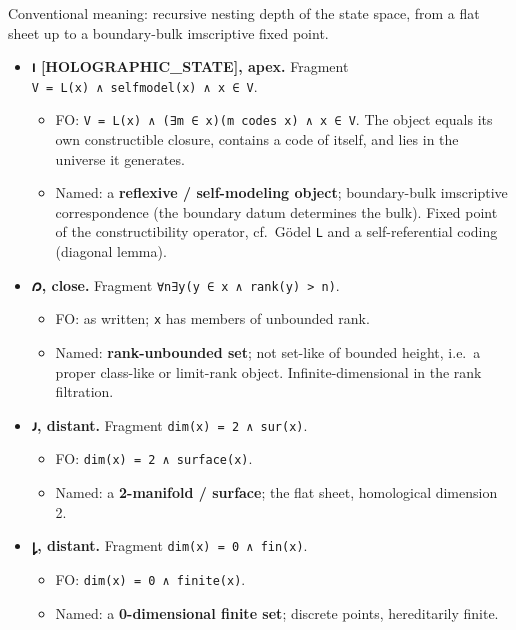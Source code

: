 \documentclass[12pt,a4paper]{article}
\begin{document}
Conventional meaning: recursive nesting depth of the state space, from a
flat sheet up to a boundary-bulk imscriptive fixed point.

\begin{itemize}
\tightlist
\item
  \textbf{𐑦 {[}HOLOGRAPHIC\_STATE{]}, apex.} Fragment
  \texttt{V\ =\ L(x)\ ∧\ selfmodel(x)\ ∧\ x\ ∈\ V}.

  \begin{itemize}
  \tightlist
  \item
    FO: \texttt{V\ =\ L(x)\ ∧\ (∃m\ ∈\ x)(m\ codes\ x)\ ∧\ x\ ∈\ V}. The
    object equals its own constructible closure, contains a code of
    itself, and lies in the universe it generates.
  \item
    Named: a \textbf{reflexive / self-modeling object}; boundary-bulk
    imscriptive correspondence (the boundary datum determines the bulk).
    Fixed point of the constructibility operator, cf.~Gödel \texttt{L}
    and a self-referential coding (diagonal lemma).
  \end{itemize}
\item
  \textbf{𐑼, close.} Fragment
  \texttt{∀n∃y(y\ ∈\ x\ ∧\ rank(y)\ \textgreater{}\ n)}.

  \begin{itemize}
  \tightlist
  \item
    FO: as written; \texttt{x} has members of unbounded rank.
  \item
    Named: \textbf{rank-unbounded set}; not set-like of bounded height,
    i.e.~a proper class-like or limit-rank object. Infinite-dimensional
    in the rank filtration.
  \end{itemize}
\item
  \textbf{𐑨, distant.} Fragment \texttt{dim(x)\ =\ 2\ ∧\ sur(x)}.

  \begin{itemize}
  \tightlist
  \item
    FO: \texttt{dim(x)\ =\ 2\ ∧\ surface(x)}.
  \item
    Named: a \textbf{2-manifold / surface}; the flat sheet, homological
    dimension 2.
  \end{itemize}
\item
  \textbf{𐑛, distant.} Fragment \texttt{dim(x)\ =\ 0\ ∧\ fin(x)}.

  \begin{itemize}
  \tightlist
  \item
    FO: \texttt{dim(x)\ =\ 0\ ∧\ finite(x)}.
  \item
    Named: a \textbf{0-dimensional finite set}; discrete points,
    hereditarily finite.
  \end{itemize}
\end{itemize}
\end{document}
